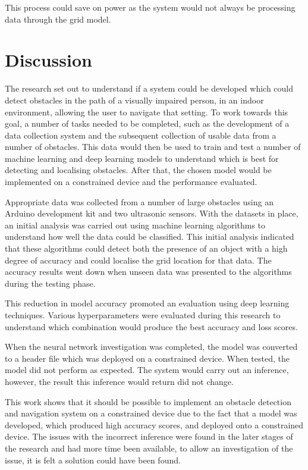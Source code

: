 \documentclass[conference]{IEEEtran}
\begin{document}
This process could save on power as the system would not always be processing data through the grid model.

\section{Discussion}
The research set out to understand if a system could be developed which could detect obstacles in the path of a visually impaired person, in an indoor environment, allowing the user to navigate that setting. To work towards this goal, a number of tasks needed to be completed, such as the development of a data collection system and the subsequent collection of usable data from a number of obstacles. This data would then be used to train and test a number of machine learning and deep learning models to understand which is best for detecting and localising obstacles. After that, the chosen model would be implemented on a constrained device and the performance evaluated. 

Appropriate data was collected from a number of large obstacles using an Arduino development kit and two ultrasonic sensors. With the datasets in place, an initial analysis was carried out using machine learning algorithms to understand how well the data could be classified. This initial analysis indicated that these algorithms could detect both the presence of an object with a high degree of accuracy and could localise the grid location for that data. The accuracy results went down when unseen data was presented to the algorithms during the testing phase. 

This reduction in model accuracy promoted an evaluation using deep learning techniques. Various hyperparameters were evaluated during this research to understand which combination would produce the best accuracy and loss scores. 

When the neural network investigation was completed, the model was converted to a header file which was deployed on a constrained device. When tested, the model did not perform as expected. The system would carry out an inference, however, the result this inference would return did not change.

This work shows that it should be possible to implement an obstacle detection and navigation system on a constrained device due to the fact that a model was developed, which produced high accuracy scores, and deployed onto a constrained device. The issues with the incorrect inference were found in the later stages of the research and had more time been available, to allow an investigation of the issue, it is felt a solution could have been found.
\end{document}
